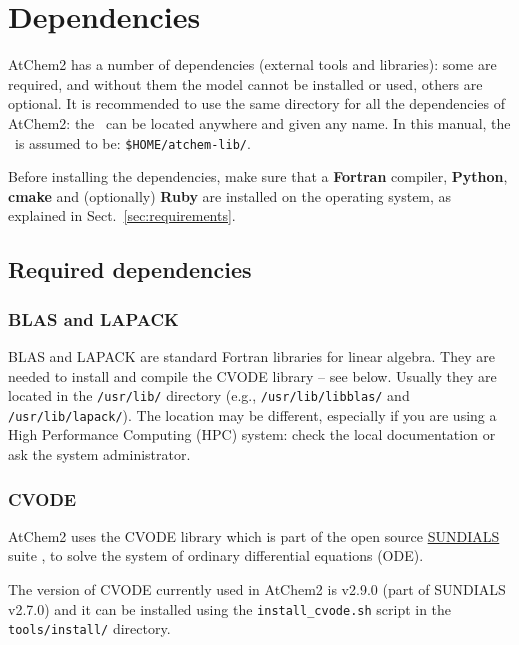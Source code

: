\section{Dependencies} \label{sec:dependencies}

AtChem2 has a number of dependencies (external tools and libraries):
some are required, and without them the model cannot be installed or
used, others are optional. It is recommended to use the same directory
for all the dependencies of AtChem2: the \depdir\ can be located
anywhere and given any name. In this manual, the \depdir\ is
assumed to be: \texttt{\$HOME/atchem-lib/}.

Before installing the dependencies, make sure that a \textbf{Fortran}
compiler, \textbf{Python}, \textbf{cmake} and (optionally)
\textbf{Ruby} are installed on the operating system, as explained in
Sect.~\ref{sec:requirements}.

\subsection{Required dependencies} \label{subsec:required-dependencies}

\subsubsection{BLAS and LAPACK}

BLAS and LAPACK are standard Fortran libraries for linear
algebra. They are needed to install and compile the CVODE library --
see below. Usually they are located in the \texttt{/usr/lib/}
directory (e.g., \texttt{/usr/lib/libblas/} and
\texttt{/usr/lib/lapack/}). The location may be different, especially
if you are using a High Performance Computing (HPC) system: check the
local documentation or ask the system administrator.

\subsubsection{CVODE}

AtChem2 uses the CVODE library which is part of the open source
\href{https://computation.llnl.gov/projects/sundials}{SUNDIALS} suite
\citep{hindmarsh_2005}, to solve the system of ordinary differential
equations (ODE).

The version of CVODE currently used in AtChem2 is v2.9.0 (part of
SUNDIALS v2.7.0) and it can be installed using the \texttt{install\_cvode.sh}
script in the \texttt{tools/install/} directory.

